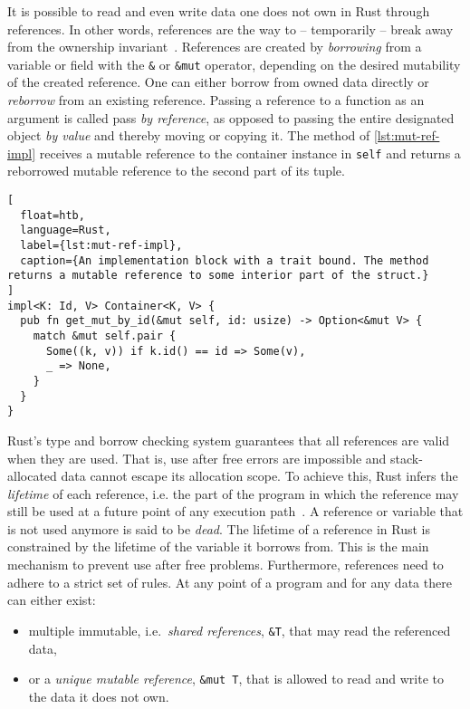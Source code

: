 It is possible to read and even write data one does not own in Rust through
references. In other words, references are the way to -- temporarily -- break
away from the ownership invariant~\cite{lightweight-formalism}. References are
created by \emph{borrowing} from a variable or field with the \lstinline!&! or
\lstinline!&mut! operator, depending on the desired mutability of the created
reference. One can either borrow from owned data directly or \emph{reborrow}
from an existing reference. Passing a reference to a function as an argument is
called pass \emph{by reference}, as opposed to passing the entire designated
object \emph{by value} and thereby moving or copying it. The method of
\autoref{lst:mut-ref-impl} receives a mutable reference to the container
instance in \lstinline!self! and returns a reborrowed mutable reference to the
second part of its tuple.

\begin{lstlisting}[
  float=htb,
  language=Rust,
  label={lst:mut-ref-impl},
  caption={An implementation block with a trait bound. The method returns a mutable reference to some interior part of the struct.}
]
impl<K: Id, V> Container<K, V> {
  pub fn get_mut_by_id(&mut self, id: usize) -> Option<&mut V> {
    match &mut self.pair {
      Some((k, v)) if k.id() == id => Some(v),
      _ => None,
    }
  }
}
\end{lstlisting}

Rust's type and borrow checking system guarantees that all references are valid
when they are used. That is, use after free errors are impossible and
stack-allocated data cannot escape its allocation scope. To achieve this, Rust
infers the \emph{lifetime} of each reference, i.e. the part of the program in
which the reference may still be used at a future point of any execution
path~\cite{wiki:live-vars}. A reference or variable that is not used anymore is
said to be \emph{dead}. The lifetime of a reference in Rust is constrained by
the lifetime of the variable it borrows from. This is the main  mechanism to
prevent use after free problems. Furthermore, references need to adhere to a
strict set of rules. At any point of a program and for any data there can either
exist:


\begin{itemize}
\tightlist
\item multiple immutable, i.e.~\emph{shared references}, \lstinline!&T!,  that
may read the referenced data,

\item or a \emph{unique mutable reference}, \passthrough{\lstinline!&mut T!},
that is allowed to read and write to the data it does not own.
\end{itemize}

